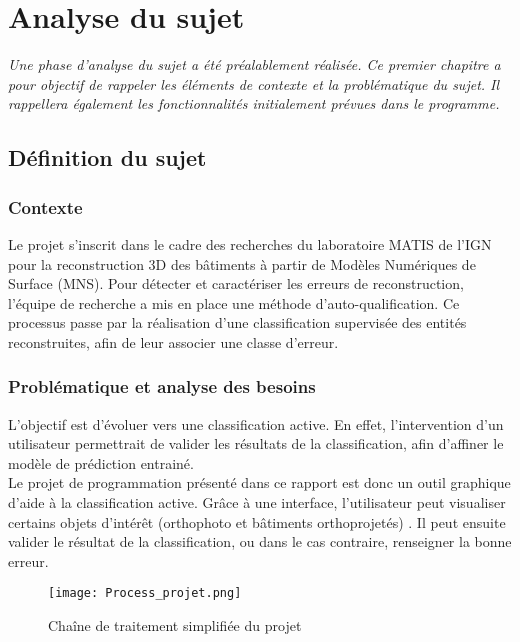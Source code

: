 \chapter[Analyse du sujet]{Analyse du sujet}

\textit{Une phase d'analyse du sujet a été préalablement réalisée. Ce premier chapitre a pour objectif de rappeler les éléments de contexte et la problématique du sujet. Il rappellera également les fonctionnalités initialement prévues dans le programme.}

\section{Définition du sujet}

\subsection{Contexte}

Le projet s’inscrit dans le cadre des recherches du laboratoire MATIS de l'IGN pour la reconstruction 3D des bâtiments à partir de Modèles Numériques de Surface (MNS). Pour détecter et caractériser les erreurs de reconstruction, l’équipe de recherche a mis en place une méthode d’auto-qualification. Ce processus passe par la réalisation d’une classification supervisée des entités reconstruites, afin de leur associer une classe d’erreur.

\subsection{Problématique et analyse des besoins}

L’objectif est d’évoluer vers une classification active. En effet, l’intervention d’un utilisateur permettrait de valider les résultats de la classification, afin d’affiner le modèle de prédiction entrainé.\\

Le projet de programmation présenté dans ce rapport est donc un outil graphique d'aide à la classification active. Grâce à une interface, l'utilisateur peut visualiser certains objets d'intérêt (orthophoto et bâtiments orthoprojetés) . Il peut ensuite valider le résultat de la classification, ou dans le cas contraire, renseigner la bonne erreur.\\

\begin{figure}[!h]
	\begin{center}
		\texttt{[image: Process\_projet.png]}  \\
		\caption[Chaîne de traitement simplifiée du projet]{Chaîne de traitement simplifiée du projet}
		\label{fig:processprojet}
	\end{center}
\end{figure}

